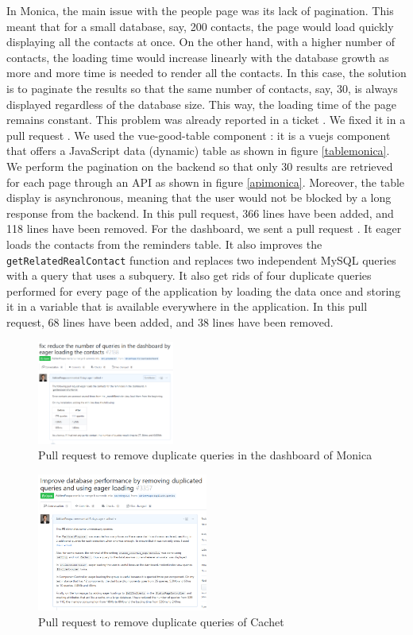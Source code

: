 \documentclass[sigconf]{acmart}
\begin{document}
In Monica, the main issue with the people page was its lack of pagination. This meant that for a small database, say, 200 contacts, the page would load quickly displaying all the contacts at once. On the other hand, with a higher number of contacts, the loading time would increase linearly with the database growth as more and more time is needed to render all the contacts. In this case, the solution is to paginate the results so that the same number of contacts, say, 30, is always displayed regardless of the database size. This way, the loading time of the page remains constant. This problem was already reported in a ticket \cite{MonicaPagination}. We fixed it in a pull request \cite{prpeoplemonica}. We used the vue-good-table component \cite{vgt}: it is a vuejs component that offers a JavaScript data (dynamic) table as shown in figure \ref{tablemonica}. We perform the pagination on the backend so that only 30 results are retrieved for each page through an API as shown in figure \ref{apimonica}. Moreover, the table display is asynchronous, meaning that the user would not be blocked by a long response from the backend. In this pull request, 366 lines have been added, and 118 lines have been removed. For the dashboard, we sent a pull request \cite{prdashboardmonica}. It eager loads the contacts from the reminders table. It also improves the \texttt{getRelatedReal\-Contact} function and replaces two independent MySQL queries with a query that uses a subquery. It also get rids of four duplicate queries performed for every page of the application by loading the data once and storing it in a variable that is available everywhere in the application. In this pull request, 68 lines have been added, and 38 lines have been removed.
\begin{figure}[t!]
\includegraphics[width=0.4\textwidth]{prdashboard}
\caption{Pull request to remove duplicate queries in the dashboard of Monica}
\label{prdashboard}
\end{figure}
\begin{figure}[t!]
\includegraphics[width=0.5\textwidth]{prcachet}
\caption{Pull request to remove duplicate queries of Cachet}
\label{prcachet}
\end{figure}
\end{document}
